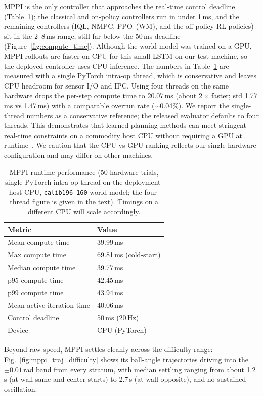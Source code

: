 MPPI is the only controller that approaches the real-time control
deadline (Table~\ref{tab:mppi_runtime}); the classical and on-policy
controllers run in under 1\,ms, and the remaining controllers
(IQL, NMPC, PPO~(WM), and the off-policy RL policies) sit in the
2--8\,ms range, still far below the 50\,ms deadline
(Figure~\ref{fig:compute_time}).
Although the world model was trained on a GPU, MPPI rollouts are
faster on CPU for this small LSTM on our test machine, so the
deployed controller uses CPU inference.  The numbers in
Table~\ref{tab:mppi_runtime} are measured with a single PyTorch
intra-op thread, which is conservative and leaves CPU headroom for
sensor I/O and IPC.  Using four threads on the same hardware drops
the per-step compute time to 20.07\,ms (about 2\,$\times$ faster;
std 1.77\,ms vs 1.47\,ms) with a comparable overrun rate
($\sim$0.04\%).  We report the single-thread numbers as a conservative
reference; the released evaluator defaults to four threads.  This demonstrates
that learned planning methods can meet stringent real-time
constraints on a commodity host CPU without requiring a GPU at
runtime~\cite{wang2024deployable}.  We caution that the CPU-vs-GPU
ranking reflects our single hardware configuration and may differ on
other machines.

\begin{table}[!ht]
\centering
\caption{MPPI runtime performance (50 hardware trials, single PyTorch
  intra-op thread on the deployment-host CPU, \texttt{calib196\_160} world
  model; the four-thread figure is given in the text). Timings on a different
  CPU will scale accordingly.}
\label{tab:mppi_runtime}
\begin{tabular}{ll}
\toprule
\textbf{Metric} & \textbf{Value} \\
\midrule
Mean compute time & 39.99\,ms \\
Max compute time & 69.81\,ms (cold-start) \\
Median compute time & 39.77\,ms \\
p95 compute time & 42.45\,ms \\
p99 compute time & 43.94\,ms \\
Mean active iteration time & 40.06\,ms \\
Control deadline & 50\,ms (20\,Hz) \\
Device & CPU (PyTorch) \\
\bottomrule
\end{tabular}
\end{table}

Beyond raw speed, MPPI settles cleanly across the difficulty range:
Fig.~\ref{fig:mppi_traj_difficulty} shows its ball-angle trajectories driving
into the $\pm0.01$\,rad band from every stratum, with median settling ranging
from about 1.2\,s (at-wall-same and center starts) to 2.7\,s
(at-wall-opposite), and no sustained oscillation.

